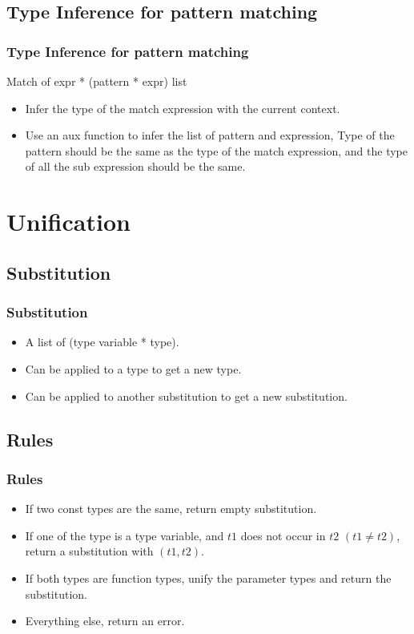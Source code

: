 \documentclass[t]{beamer}
\begin{document}
    \subsection{Type Inference for pattern matching}
    \begin{frame}
        \frametitle{Type Inference for pattern matching}
        {\ttfamily Match of expr * (pattern * expr) list}
        \begin{itemize}
            \item Infer the type of the match expression with the current context.
            \item Use an aux function to infer the list of pattern and expression,
            Type of the pattern should be the same as the type of the match expression, 
            and the type of all the sub expression should be the same.
        \end{itemize}
    \end{frame}

    \section{Unification}
    \subsection{Substitution}
    \begin{frame}
        \frametitle{Substitution}
        \begin{itemize}
            \item A list of (type variable * type).
            \item Can be applied to a type to get a new type.
            \item Can be applied to another substitution to get a new substitution.
        \end{itemize}
    \end{frame}

    \subsection{Rules}
    \begin{frame}
        \frametitle{Rules}
        \begin{itemize}
            \item If two const types are the same, return empty substitution.
            \item If one of the type is a type variable, and $t1$ does not occur in $t2$ $(t1 \neq t2)$, return a substitution with $(t1, t2)$.
            \item If both types are function types, unify the parameter types and return the substitution.
            \item Everything else, return an error.
        \end{itemize}
    \end{frame}
\end{document}
